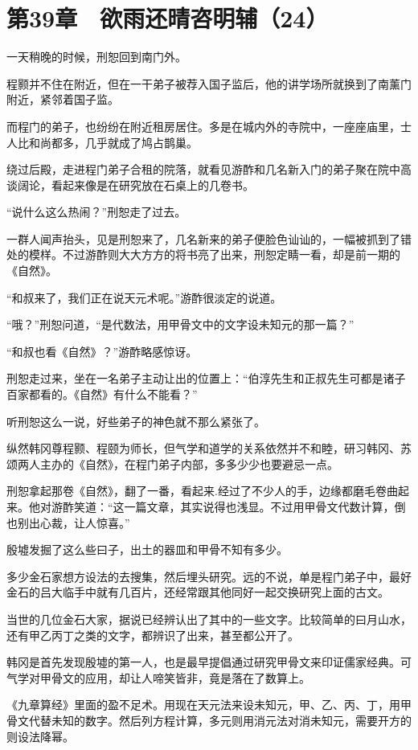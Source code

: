 \section{第39章　欲雨还晴咨明辅（24）}

一天稍晚的时候，刑恕回到南门外。

程颢并不住在附近，但在一干弟子被荐入国子监后，他的讲学场所就换到了南薰门附近，紧邻着国子监。

而程门的弟子，也纷纷在附近租房居住。多是在城内外的寺院中，一座座庙里，士人比和尚都多，几乎就成了鸠占鹊巢。

绕过后殿，走进程门弟子合租的院落，就看见游酢和几名新入门的弟子聚在院中高谈阔论，看起来像是在研究放在石桌上的几卷书。

“说什么这么热闹？”刑恕走了过去。

一群人闻声抬头，见是刑恕来了，几名新来的弟子便脸色讪讪的，一幅被抓到了错处的模样。不过游酢则大大方方的将书亮了出来，刑恕定睛一看，却是前一期的《自然》。

“和叔来了，我们正在说天元术呢。”游酢很淡定的说道。

“哦？”刑恕问道，“是代数法，用甲骨文中的文字设未知元的那一篇？”

“和叔也看《自然》？”游酢略感惊讶。

刑恕走过来，坐在一名弟子主动让出的位置上：“伯淳先生和正叔先生可都是诸子百家都看的。《自然》有什么不能看？”

听刑恕这么一说，好些弟子的神色就不那么紧张了。

纵然韩冈尊程颢、程颐为师长，但气学和道学的关系依然并不和睦，研习韩冈、苏颂两人主办的《自然》，在程门弟子内部，多多少少也要避忌一点。

刑恕拿起那卷《自然》，翻了一番，看起来.经过了不少人的手，边缘都磨毛卷曲起来。他对游酢笑道：“这一篇文章，其实说得也浅显。不过用甲骨文代数计算，倒也别出心裁，让人惊喜。”

殷墟发掘了这么些曰子，出土的器皿和甲骨不知有多少。

多少金石家想方设法的去搜集，然后埋头研究。远的不说，单是程门弟子中，最好金石的吕大临手中就有几百片，还经常跟其他同好一起交换研究上面的古文。

当世的几位金石大家，据说已经辨认出了其中的一些文字。比较简单的曰月山水，还有甲乙丙丁之类的文字，都辨识了出来，甚至都公开了。

韩冈是首先发现殷墟的第一人，也是最早提倡通过研究甲骨文来印证儒家经典。可气学对甲骨文的应用，却让人啼笑皆非，竟是落在了数算上。

《九章算经》里面的盈不足术。用现在天元法来设未知元，甲、乙、丙、丁，用甲骨文代替未知的数字。然后列方程计算，多元则用消元法对消未知元，需要开方的则设法降幂。

